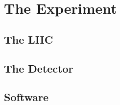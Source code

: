 \chapter{The \atlas Experiment}
\section{The LHC}
\section{The \atlas Detector}
\section{\atlas Software}

